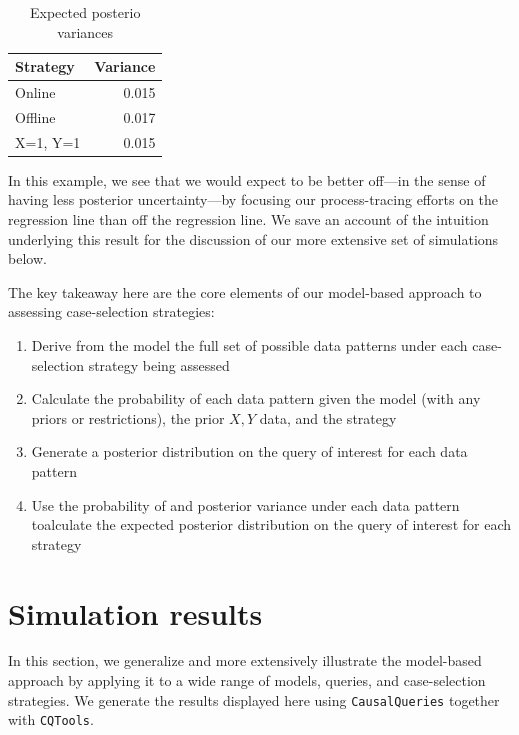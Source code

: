 \documentclass[
  12pt,
]{book}
\providecommand{\tightlist}{%
  \setlength{\itemsep}{0pt}\setlength{\parskip}{0pt}}
\begin{document}
\begin{table}

\caption{\label{tab:exppostvar}Expected posterio variances}
\centering
\begin{tabular}[t]{lr}
\toprule
Strategy & Variance\\
\midrule
Online & 0.015\\
Offline & 0.017\\
X=1, Y=1 & 0.015\\
\bottomrule
\end{tabular}
\end{table}

In this example, we see that we would expect to be better off---in the sense of having less posterior uncertainty---by focusing our process-tracing efforts on the regression line than off the regression line. We save an account of the intuition underlying this result for the discussion of our more extensive set of simulations below.

The key takeaway here are the core elements of our model-based approach to assessing case-selection strategies:

\begin{enumerate}
\def\labelenumi{\arabic{enumi}.}
\tightlist
\item
  Derive from the model the full set of possible data patterns under each case-selection strategy being assessed
\item
  Calculate the probability of each data pattern given the model (with any priors or restrictions), the prior \(X,Y\) data, and the strategy
\item
  Generate a posterior distribution on the query of interest for each data pattern
\item
  Use the probability of and posterior variance under each data pattern toalculate the expected posterior distribution on the query of interest for each strategy
\end{enumerate}

\hypertarget{simulation-results}{%
\section{Simulation results}\label{simulation-results}}

In this section, we generalize and more extensively illustrate the model-based approach by applying it to a wide range of models, queries, and case-selection strategies. We generate the results displayed here using \texttt{CausalQueries} together with \texttt{CQTools}.
\end{document}
